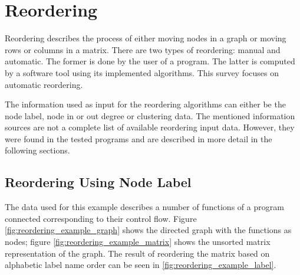 %
%
% 
% 
% 


\chapter{Reordering}
\label{chap:reordering}

Reordering describes the process of either moving nodes in a graph or moving rows or columns in a matrix. There are two types of reordering: manual and automatic. The former is done by the user of a program. The latter is computed by a software tool using its implemented algorithms. This survey focuses on automatic reordering.

The information used as input for the reordering algorithms can either be the node label, node in or out degree or clustering data. The mentioned information sources are not a complete list of available reordering input data. However, they were found in the tested programs and are described in more detail in the following sections.


\section{Reordering Using Node Label}
\label{sec:reordering_label}
The data used for this example describes a number of functions of a program connected corresponding to their control flow. Figure \ref{fig:reordering_example_graph} shows the directed graph with the functions as nodes; figure \ref{fig:reordering_example_matrix} shows the unsorted matrix representation of the graph. The result of reordering the matrix based on alphabetic label name order can be seen in \ref{fig:reordering_example_label}.

